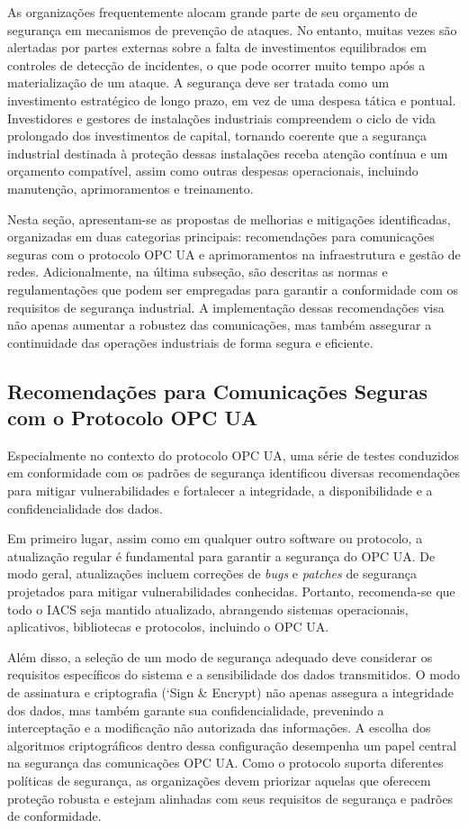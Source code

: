     As organizações frequentemente alocam grande parte de seu orçamento de segurança em mecanismos de prevenção de ataques. No entanto, muitas vezes são alertadas por partes externas sobre a falta de investimentos equilibrados em controles de detecção de incidentes, o que pode ocorrer muito tempo após a materialização de um ataque. A segurança deve ser tratada como um investimento estratégico de longo prazo, em vez de uma despesa tática e pontual. Investidores e gestores de instalações industriais compreendem o ciclo de vida prolongado dos investimentos de capital, tornando coerente que a segurança industrial destinada à proteção dessas instalações receba atenção contínua e um orçamento compatível, assim como outras despesas operacionais, incluindo manutenção, aprimoramentos e treinamento.

    Nesta seção, apresentam-se as propostas de melhorias e mitigações identificadas, organizadas em duas categorias principais: recomendações para comunicações seguras com o protocolo OPC UA e aprimoramentos na infraestrutura e gestão de redes. Adicionalmente, na última subseção, são descritas as normas e regulamentações que podem ser empregadas para garantir a conformidade com os requisitos de segurança industrial. A implementação dessas recomendações visa não apenas aumentar a robustez das comunicações, mas também assegurar a continuidade das operações industriais de forma segura e eficiente.

    \subsection{Recomendações para Comunicações Seguras com o Protocolo OPC UA}

        Especialmente no contexto do protocolo OPC UA, uma série de testes conduzidos em conformidade com os padrões de segurança identificou diversas recomendações para mitigar vulnerabilidades e fortalecer a integridade, a disponibilidade e a confidencialidade dos dados.

        Em primeiro lugar, assim como em qualquer outro software ou protocolo, a atualização regular é fundamental para garantir a segurança do OPC UA. De modo geral, atualizações incluem correções de \textit{bugs} e \textit{patches} de segurança projetados para mitigar vulnerabilidades conhecidas. Portanto, recomenda-se que todo o IACS seja mantido atualizado, abrangendo sistemas operacionais, aplicativos, bibliotecas e protocolos, incluindo o OPC UA.

        Além disso, a seleção de um modo de segurança adequado deve considerar os requisitos específicos do sistema e a sensibilidade dos dados transmitidos. O modo de assinatura e criptografia (`Sign \& Encrypt) não apenas assegura a integridade dos dados, mas também garante sua confidencialidade, prevenindo a interceptação e a modificação não autorizada das informações. A escolha dos algoritmos criptográficos dentro dessa configuração desempenha um papel central na segurança das comunicações OPC UA. Como o protocolo suporta diferentes políticas de segurança, as organizações devem priorizar aquelas que oferecem proteção robusta e estejam alinhadas com seus requisitos de segurança e padrões de conformidade.

